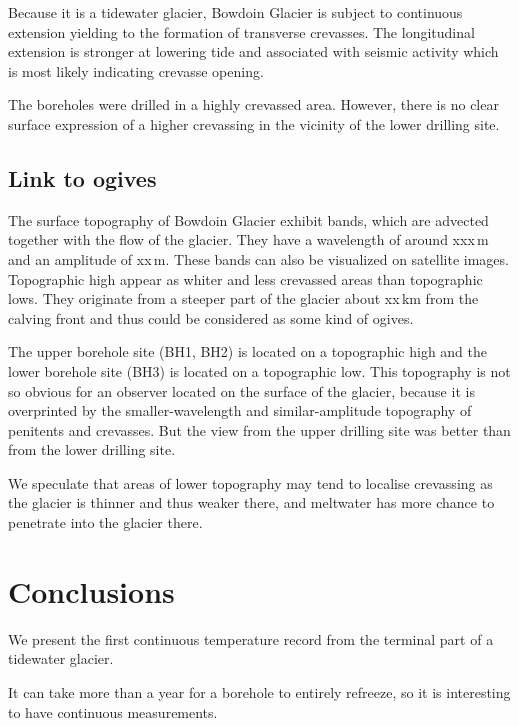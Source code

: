 \documentclass[utf8]{article}
\begin{document}
    Because it is a tidewater glacier, Bowdoin Glacier is subject to continuous
    extension yielding to the formation of transverse crevasses. The
    longitudinal extension is stronger at lowering tide and associated with
    seismic activity which is most likely indicating crevasse opening.

    The boreholes were drilled in a highly crevassed area. However, there is
    no clear surface expression of a higher crevassing in the vicinity of the
    lower drilling site.

\subsection{Link to ogives}

    The surface topography of Bowdoin Glacier exhibit bands, which are advected
    together with the flow of the glacier. They have a wavelength of around
    xxx\,m and an amplitude of xx\,m. These bands can also be visualized on
    satellite images. Topographic high appear as whiter and less crevassed
    areas than topographic lows. They originate from a steeper part of the
    glacier about xx\,km from the calving front and thus could be considered as
    some kind of ogives.

    The upper borehole site (BH1, BH2) is located on a topographic high and the
    lower borehole site (BH3) is located on a topographic low. This topography
    is not so obvious for an observer located on the surface of the glacier,
    because it is overprinted by the smaller-wavelength and similar-amplitude
    topography of penitents and crevasses. But the view from the upper drilling
    site was better than from the lower drilling site.

    We speculate that areas of lower topography may tend to localise crevassing
    as the glacier is thinner and thus weaker there, and meltwater has more
    chance to penetrate into the glacier there.

\section{Conclusions}

    We present the first continuous temperature record from the terminal part
    of a tidewater glacier.

    It can take more than a year for a borehole to entirely refreeze, so it is
    interesting to have continuous measurements.
\end{document}
